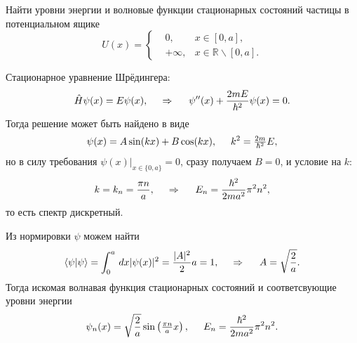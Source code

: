 
\begin{leftrules}
Найти уровни энергии и волновые функции стационарных состояний частицы в потенциальном ящике
\begin{equation*}
    U(x) = \left\{\begin{aligned}
        &0, &x \in [0, a], \\
        &+\infty, &x \in \mathbb{R} \backslash [0, a].
    \end{aligned}\right.
\end{equation*}
\end{leftrules}


Стационарное уравнение Шрёдингера:
\begin{equation*}
    \hat{H}\psi(x) = E \psi(x),
    \hspace{0.5cm} \Rightarrow \hspace{0.5cm}
    \psi''(x) + \frac{2m E}{\hbar^2} \psi(x)  = 0.
\end{equation*}
Тогда решение может быть найдено в виде
\begin{equation*}
    \psi(x) = A \sin (kx) + B \cos(kx), \hspace{5 mm} 
    k^2 = \tfrac{2m}{\hbar^2}E,
\end{equation*}
но в силу требования $\psi(x)|_{x \in \{0, a\}} = 0$, сразу получаем $B =0 $, и условие на $k$:
\begin{equation*}
    k = k_n = \frac{\pi n}{a},
    \hspace{0.5cm} \Rightarrow \hspace{0.5cm}
    E_n = \frac{\hbar^2}{2m a^2} \pi^2 n^2,
\end{equation*}
то есть спектр дискретный. 

Из нормировки $\psi$ можем найти
\begin{equation*}
    \bk{\psi}{\psi} = \int_0^a \d x |\psi(x)|^2 = \frac{|A|^2}{2} a = 1,
    \hspace{0.5cm} \Rightarrow \hspace{0.5cm}
    A = \sqrt{\frac{2}{a}}.
\end{equation*}
Тогда искомая волнавая функция стационарных состояний и соответсвующие уровни энергии
\begin{equation*}
    \psi_n (x) = \sqrt{\frac{2}{a}} \sin \left(\tfrac{\pi n}{a} x\right) ,
    \hspace{5 mm} 
    E_n = \frac{\hbar^2}{2m a^2} \pi^2 n^2.
\end{equation*}
